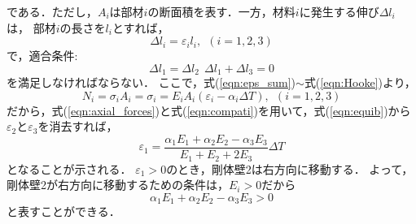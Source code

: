 ﻿\documentclass[10pt,a4j]{jarticle}
\begin{document}
である．ただし，$A_i$は部材$i$の断面積を表す．一方，材料$i$に発生する伸び$\Delta l_i$は，
部材$i$の長さを$l_i$とすれば，
\begin{equation}
	\Delta l_i = \varepsilon_i l_i, \ \ (i=1,2,3) 
\end{equation}
で，適合条件:
\begin{equation}
	\Delta l_1=\Delta l_2 \ \ \Delta l_1+\Delta l_3=0
	\label{eqn:compati}
\end{equation}
を満足しなければならない．
ここで，式(\ref{eqn:eps_sum})$\sim$式(\ref{eqn:Hooke})より，
\begin{equation}
	N_i=\sigma_i A_i=\sigma_i=E_iA_i\left( \varepsilon_i-\alpha_i \Delta T\right), \ \ (i=1,2,3)
	\label{eqn:axial_forces}
\end{equation}
だから，式(\ref{eqn:axial_forces})と式(\ref{eqn:compati})を用いて，式(\ref{eqn:equib})から
$\varepsilon_2$と$\varepsilon_3$を消去すれば，
\begin{equation}
	\varepsilon_1=\frac{\alpha_1E_1+\alpha_2E_2-\alpha_3 E_3}{E_1+E_2+2E_3} \Delta T
\end{equation}
となることが示される．
$\varepsilon_1>0$のとき，剛体壁2は右方向に移動する．
よって，剛体壁2が右方向に移動するための条件は，$E_i>0$だから
\begin{equation}
	\alpha_1E_1+\alpha_2E_2-\alpha_3 E_3 >0
\end{equation}
と表すことができる．
\end{document}
